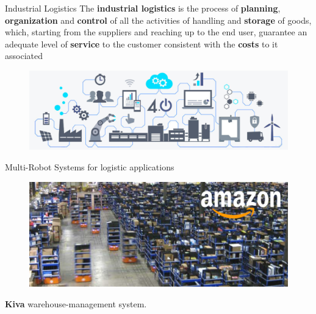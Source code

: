 
    \begin{frame}[fragile]{Industrial Logistics}
        The {\bf industrial logistics} is the process of {\bf planning}, {\bf organization}
        and {\bf control} of all the activities of handling and {\bf storage} of goods, which, starting
        from the suppliers and reaching up to the end user, guarantee an adequate
        level of {\bf service} to the customer consistent with the {\bf costs} to it associated

        \begin{figure}[hbt]
            \centering
            \includegraphics[width=\textwidth]{img/ind4.png}
        \end{figure}
    \end{frame}

    \begin{frame}[fragile]{Multi-Robot Systems for logistic applications}

        \begin{figure}[hbt]
            \centering
            \includegraphics[width=\textwidth]{img/kiva.png}
        \end{figure}
        
        \begin{center}
        {\bf Kiva} warehouse-management system.
        \end{center}
    \end{frame}

